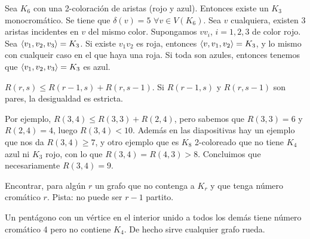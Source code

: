 \documentclass[TGyGC.tex]{subfiles}
\begin{document}
\begin{ej}
Sea $K_6$ con una 2-coloración de aristas (rojo y azul). Entonces existe un $K_3$ monocromático. Se tiene que $\delta(v)=5$ $\forall v\in V(K_6)$. Sea $v$ cualquiera, existen 3 aristas incidentes en $v$ del mismo color. Supongamos $vv_i$, $i=1,2,3$ de color rojo. Sea $\langle{v_1,v_2,v_3}\rangle=K_3$. Si existe $v_1v_2$ es roja, entonces $\langle{v,v_1, v_2}\rangle=K_3$, y lo mismo con cualqueir caso en el que haya una roja. Si toda son azules, entonces tenemos que $\langle{v_1,v_2,v_3}\rangle=K_3$ es azul.  
\end{ej}

\begin{teorema}
$R(r,s)\leq R(r-1,s)+R(r,s-1)$. Si $R(r-1,s)$ y $R(r,s-1)$ son pares, la desigualdad es estricta. 
\end{teorema}

Por ejemplo, $R(3,4)\leq R(3,3)+R(2,4)$, pero sabemos que $R(3,3)=6$ y $R(2,4)=4$, luego $R(3,4)<10$. Además en las diapositivas hay un ejemplo que nos da $R(3,4)\geq 7$, y otro ejemplo que es $K_8$ 2-coloreado que no tiene $K_4$ azul ni $K_3$ rojo, con lo que $R(3,4)=R(4,3)>8$. Concluimos que necesariamente $R(3,4)=9$. 

\begin{ejer}
Encontrar, para algún $r$ un grafo que no contenga a $K_r$ y que tenga número cromático $r$. Pista: no puede ser $r-1$ partito. 
\end{ejer}
Un pentágono con un vértice en el interior unido a todos los demás tiene número cromático 4 pero no contiene $K_4$. De hecho sirve cualquier grafo rueda.
\end{document}
